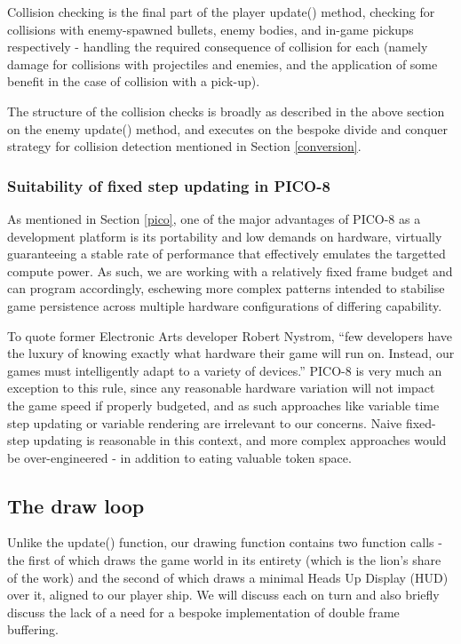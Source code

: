 \documentclass[11pt]{article}
\begin{document}
Collision checking is the final part of the player update() method, checking for collisions with
enemy-spawned bullets, enemy bodies, and in-game pickups respectively - handling the required
consequence of collision for each (namely damage for collisions with projectiles and enemies, and
the application of some benefit in the case of collision with a pick-up).

The structure of the collision
checks is broadly as described in the above section on the enemy update() method, and executes on 
the bespoke divide and conquer strategy for collision detection mentioned in Section \ref{conversion}.

\subsubsection*{Suitability of fixed step updating in PICO-8}

As mentioned in Section \ref{pico}, one of the major advantages of PICO-8 as a development platform
is its portability and low demands on hardware, virtually guaranteeing a stable rate of performance
that effectively emulates the targetted compute power. As such, we are working with a relatively fixed
frame budget and can program accordingly, eschewing more complex patterns intended to stabilise
game persistence across multiple hardware configurations of differing capability.

To quote former Electronic Arts developer Robert Nystrom\cite[p. 126]{nystrom}, ``few developers have
the luxury of knowing exactly what hardware their game will run on. Instead, our games must intelligently
adapt to a variety of devices.'' PICO-8 is very much an exception to this rule, since any reasonable
hardware variation will not impact the game speed if properly budgeted, and as such approaches like
variable time step updating or variable rendering are irrelevant to our concerns. Naive fixed-step updating
is reasonable in this context, and more complex approaches would be over-engineered - in addition to eating
valuable token space.

\subsection{The draw loop}\label{draw}

Unlike the \textunderscore update() function, our drawing function contains two function calls - the first of which
draws the game world in its entirety (which is the lion's share of the work) and the second of which
draws a minimal Heads Up Display (HUD) over it, aligned to our player ship. We will discuss each on turn
and also briefly discuss the lack of a need for a bespoke implementation of double frame buffering.
\end{document}
